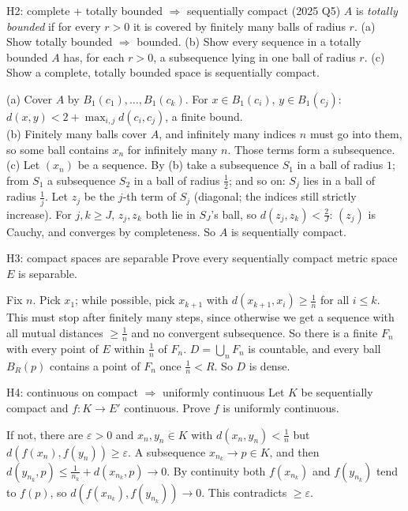 \begin{exam}{H2: complete + totally bounded $\Rightarrow$ sequentially compact (2025 Q5)}
$A$ is \emph{totally bounded} if for every $r>0$ it is covered by finitely many balls of
radius $r$. (a) Show totally bounded $\Rightarrow$ bounded. (b) Show every sequence in a totally
bounded $A$ has, for each $r>0$, a subsequence lying in one ball of radius $r$. (c) Show a
complete, totally bounded space is sequentially compact.
\end{exam}
\begin{answer}
(a) Cover $A$ by $B_1(c_1),\dots,B_1(c_k)$. For $x\in B_1(c_i)$, $y\in B_1(c_j)$:
$d(x,y)<2+\max_{i,j}d(c_i,c_j)$, a finite bound.\\
(b) Finitely many balls cover $A$, and infinitely many indices $n$ must go into them, so some
ball contains $x_n$ for infinitely many $n$. Those terms form a subsequence.\\
(c) Let $(x_n)$ be a sequence. By (b) take a subsequence $S_1$ in a ball of radius $1$; from
$S_1$ a subsequence $S_2$ in a ball of radius $\frac12$; and so on: $S_j$ lies in a ball of
radius $\frac1j$. Let $z_j$ be the $j$-th term of $S_j$ (diagonal; the indices still strictly
increase). For $j,k\ge J$, $z_j,z_k$ both lie in $S_J$'s ball, so $d(z_j,z_k)<\frac2J$: $(z_j)$
is Cauchy, and converges by completeness. So $A$ is sequentially compact.
\end{answer}

\begin{exam}{H3: compact spaces are separable}
Prove every sequentially compact metric space $E$ is separable.
\end{exam}
\begin{answer}
Fix $n$. Pick $x_1$; while possible, pick $x_{k+1}$ with $d(x_{k+1},x_i)\ge\frac1n$ for all
$i\le k$. This must stop after finitely many steps, since otherwise we get a sequence with all
mutual distances $\ge\frac1n$ and no convergent subsequence. So there is a finite $F_n$ with
every point of $E$ within $\frac1n$ of $F_n$. $D=\bigcup_nF_n$ is countable, and every ball
$B_R(p)$ contains a point of $F_n$ once $\frac1n<R$. So $D$ is dense.
\end{answer}

\begin{exam}{H4: continuous on compact $\Rightarrow$ uniformly continuous}
Let $K$ be sequentially compact and $f:K\to E'$ continuous. Prove $f$ is uniformly continuous.
\end{exam}
\begin{answer}
If not, there are $\varepsilon>0$ and $x_n,y_n\in K$ with $d(x_n,y_n)<\frac1n$ but
$d(f(x_n),f(y_n))\ge\varepsilon$. A subsequence $x_{n_k}\to p\in K$, and then
$d(y_{n_k},p)\le\frac1{n_k}+d(x_{n_k},p)\to0$. By continuity both $f(x_{n_k})$ and $f(y_{n_k})$
tend to $f(p)$, so $d(f(x_{n_k}),f(y_{n_k}))\to0$. This contradicts $\ge\varepsilon$.
\end{answer}

